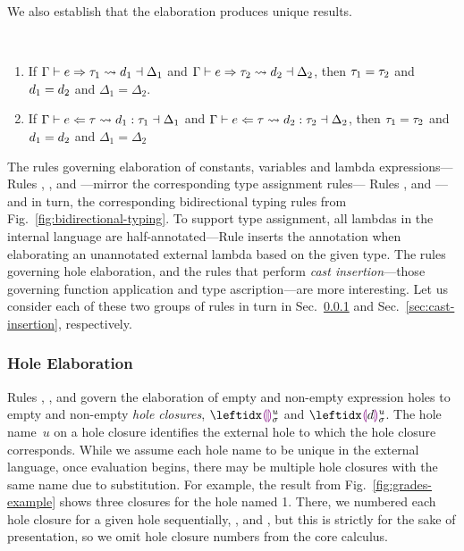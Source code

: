 We also establish that the elaboration produces unique results.
\begin{thm} \label{thm:expansion-unicity}~
  \begin{enumerate}[nolistsep]
  \item If $\Gamma \vdash e \Rightarrow \tau_1 \leadsto d{}_1 \dashv \Delta_1$ and
    $\Gamma \vdash e \Rightarrow \tau_2 \leadsto d{}_2 \dashv \Delta_2$, then
    $\tau_1 = \tau_2$ and $d{}_1 = d{}_2$ and $\Delta_1 =
    \Delta_2$.
  \item If
    $\Gamma \vdash e \Leftarrow \tau \leadsto d{}_1 : \tau_1 \dashv \Delta_1$ and
    $\Gamma \vdash e \Leftarrow \tau \leadsto d{}_2 : \tau_2 \dashv \Delta_2$, then
    $\tau_1 = \tau_2$ and $d{}_1 = d{}_2$ and $\Delta_1 =
    \Delta_2$
  \end{enumerate}
\end{thm}

The rules governing elaboration of constants, variables and lambda
expressions---Rules , , 
and ---mirror the corresponding type assignment rules---
Rules ,  and ---and in
turn, the corresponding bidirectional typing rules from
Fig.~\ref{fig:bidirectional-typing}.
%
%
To support type assignment, all lambdas in the internal language are
half-annotated---Rule  inserts the annotation when
elaborating an unannotated external lambda based on the given type.
%
The rules governing hole elaboration, and the rules that perform \emph{cast
  insertion}---those governing function application and type
ascription---are more interesting. Let us consider each of these two groups
of rules in turn in Sec.~\ref{sec:hole-elaboration} and
Sec.~\ref{sec:cast-insertion}, respectively.

\subsubsection{Hole Elaboration}\label{sec:hole-elaboration}
Rules , ,  and
 govern the elaboration of empty and non-empty
expression holes to empty and non-empty \emph{hole closures},
$\dehole{u}{\sigma}{}$ and $\dhole{\dexp}{u}{\sigma}{}$.
%
The hole name~$u$ on a hole closure identifies the external hole to which
the hole closure corresponds.
%
While we assume each hole name to be unique in the external language, once
evaluation begins, there may be multiple hole closures with the same name
due to substitution.
%
For example, the result from Fig.~\ref{fig:grades-example} shows three
closures for the hole named 1.
%
There, we numbered each hole closure for a given hole sequentially,
,  and , but this is strictly for the sake of
presentation, so we omit hole closure numbers from the core calculus.


